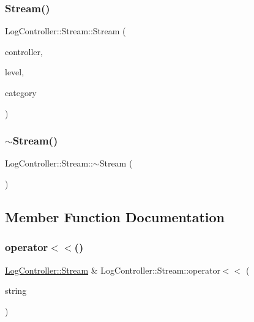 \subsubsection{\texorpdfstring{Stream()}{Stream()}}
{\footnotesize\ttfamily Log\+Controller\+::\+Stream\+::\+Stream (\begin{DoxyParamCaption}\item[{\mbox{\hyperlink{class_q_g_b_a_1_1_log_controller}{Log\+Controller}} $\ast$}]{controller,  }\item[{\mbox{\hyperlink{ioapi_8h_a787fa3cf048117ba7123753c1e74fcd6}{int}}}]{level,  }\item[{\mbox{\hyperlink{ioapi_8h_a787fa3cf048117ba7123753c1e74fcd6}{int}}}]{category }\end{DoxyParamCaption})}

\mbox{\label{class_q_g_b_a_1_1_log_controller_1_1_stream_a965239c87dc75d52b61873207616c9a2}} 
\subsubsection{\texorpdfstring{$\sim$\+Stream()}{~Stream()}}
{\footnotesize\ttfamily Log\+Controller\+::\+Stream\+::$\sim$\+Stream (\begin{DoxyParamCaption}{ }\end{DoxyParamCaption})}



\subsection{Member Function Documentation}
\mbox{\label{class_q_g_b_a_1_1_log_controller_1_1_stream_ac0bc784e5eec1ee95e3424a51c0ed7ff}} 
\subsubsection{\texorpdfstring{operator$<$$<$()}{operator<<()}}
{\footnotesize\ttfamily \mbox{\hyperlink{class_q_g_b_a_1_1_log_controller_1_1_stream}{Log\+Controller\+::\+Stream}} \& Log\+Controller\+::\+Stream\+::operator$<$$<$ (\begin{DoxyParamCaption}\item[{const Q\+String \&}]{string }\end{DoxyParamCaption})}



